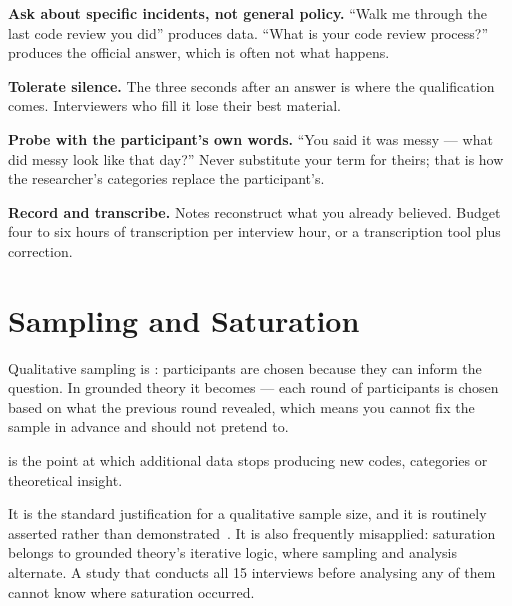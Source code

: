 \begin{conceptbox}
\begin{tightnum}
  \item \textbf{Ask about specific incidents, not general policy.} ``Walk me
    through the last code review you did'' produces data. ``What is your code
    review process?'' produces the official answer, which is often not what
    happens.
  \item \textbf{Tolerate silence.} The three seconds after an answer is where
    the qualification comes. Interviewers who fill it lose their best material.
  \item \textbf{Probe with the participant's own words.} ``You said it was
    messy --- what did messy look like that day?'' Never substitute your term
    for theirs; that is how the researcher's categories replace the
    participant's.
  \item \textbf{Record and transcribe.} Notes reconstruct what you already
    believed. Budget four to six hours of transcription per interview hour, or
    a transcription tool plus correction.
\end{tightnum}
\end{conceptbox}

\section{Sampling and Saturation}

Qualitative sampling is : participants are chosen because they
can inform the question. In grounded theory it becomes  --- each round of participants is chosen based on what the previous
round revealed, which means you cannot fix the sample in advance and should not
pretend to.

\begin{definitionbox}[Saturation]
 is the point at which additional data stops producing new
codes, categories or theoretical insight.

\medskip
It is the standard justification for a qualitative sample size, and it is
routinely asserted rather than demonstrated~\cite{saunders2018saturation}. It is
also frequently misapplied: saturation belongs to grounded theory's iterative
logic, where sampling and analysis alternate. A study that conducts all 15
interviews before analysing any of them cannot know where saturation occurred.
\end{definitionbox}

